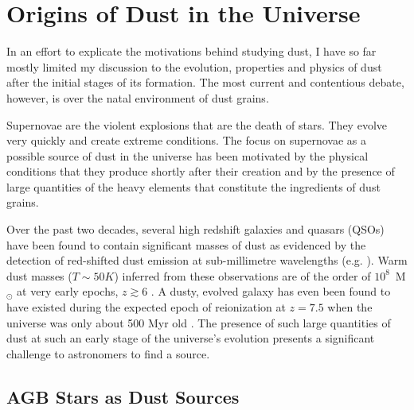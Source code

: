 \section{Origins of Dust in the Universe}
\label{scn:ccsne}
In an effort to explicate the motivations behind studying dust, I have so far mostly limited my discussion to the evolution, properties and physics of dust after the initial stages of its formation.  The most current and contentious debate, however, is over the natal environment of dust grains.  

Supernovae are the violent explosions that are the death of stars.  They evolve very quickly and create extreme conditions.  The focus on supernovae as a possible source of dust in the universe has been motivated by the physical conditions that they produce shortly after their creation and by the presence of large quantities of the heavy elements that constitute the ingredients of dust grains.

Over the past two decades, several high redshift galaxies and quasars (QSOs) have been found to contain significant masses of dust as evidenced by the detection of red-shifted dust emission at sub-millimetre wavelengths (e.g. \citealt{Carilli2001, Omont2001, Bertoldi2002, Bertoldi2003, Watson2015}).  Warm dust masses ($T\sim50K$) inferred from these observations are of the order of $10^8$~M$_{\odot}$ at very early epochs, $z \gtrsim 6$ \citep{Robson2004,Beelen2006,Dwek2007}.  A dusty, evolved galaxy has even been found to have existed during the expected epoch of reionization at $z=7.5$ when the universe was only about 500 Myr old \citep{Watson2015}.  The presence of such large quantities of dust at such an early stage of the universe's evolution presents a significant challenge to astronomers to find a source.  

\subsection{AGB Stars as Dust Sources}

